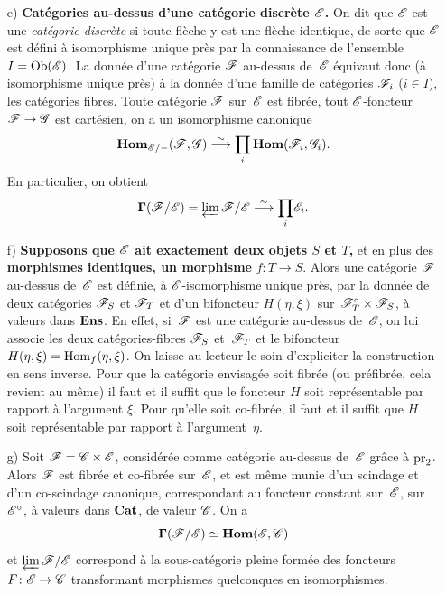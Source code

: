 \begin{enumerate}
Un cas int\'eressant est celui o\`u l'on a
$$
\cal{F}_b=\cal{F}_a^\circ,\quad G=F^\circ,\quad v=u^\circ.
$$
On appelle \emph{autodualité}
dans une cat\'egorie $\cal{C}$, la
donn\'ee d'un foncteur $D\colon \cal{C}\to\cal{C}^\circ$, et d'un
isomorphisme $u\colon DD^\circ\isomto\id_{\cal{C}}$, tels que $u$ et
l'isomorphisme $u^\circ\colon D^\circ D\isomto\id_{\cal{C}^\circ}$
fassent de~$(D,D^\circ)$ un couple de foncteurs adjoints,
(n\'ecessairement quasi-inverses l'un de l'autre). Cette condition
s'\'ecrit:
$$
D(u(x))=u(D(x))\qquad \text{pour tout $x\in\Ob(\cal{C})$.}
$$
\item[e)]
\textbf{Catégories au-dessus d'une catégorie
discrète $\cal{E}$.} On dit que $\cal{E}$ est une
\emph{catégorie discrète} si toute fl\`eche y est une
fl\`eche identique, de sorte que $\cal{E}$ est d\'efini \`a
isomorphisme unique pr\`es par la connaissance de l'ensemble
$I=\Ob(\cal{E})$. La donn\'ee d'une cat\'egorie $\cal{F}$
au-dessus de~$\cal{E}$ \'equivaut donc (\`a isomorphisme unique
pr\`es) \`a la donn\'ee d'une famille de cat\'egories
$\cal{F}_i$ ($i\in I$), les cat\'egories fibres. Toute cat\'egorie
$\cal{F}$ sur~$\cal{E}$ est fibr\'ee, tout $\cal{E}$-foncteur
$\cal{F}\to\cal{G}$ est cart\'esien, on a un isomorphisme canonique
$$ \SheafHom_{\cal{E}/-}(\cal{F},\cal{G}) \isomto
\underset{i}\prod\SheafHom(\cal{F}_i,\cal{G}_i).
$$
En particulier, on obtient
$$
\bf{\Gamma}(\cal{F}/\cal{E})=\varprojLim\cal{F}/\cal{E}\isomto\underset{i}\prod \cal{E}_i.
$$
\item[f)] \textbf{Supposons que $\cal{E}$ ait exactement deux objets
$S$ et $T$,} et en plus des \textbf{morphismes identiques, un
morphisme }$f\colon T\to S$. Alors une cat\'egorie $\cal{F}$
au-dessus de~$\cal{E}$ est d\'efinie, \`a $\cal{E}$-isomorphisme
unique pr\`es, par la donn\'ee de deux cat\'egories $\cal{F}_S$
et $\cal{F}_T$ et d'un bifoncteur $H(\eta,\xi)$ sur~$\cal{F}_T^\circ\times\cal{F}_S$, \`a valeurs dans $\mathbf{Ens}$. En effet,
si~$\cal{F}$ est une cat\'egorie au-dessus de~$\cal{E}$, on lui
associe les deux cat\'egories-fibres $\cal{F}_S$ et~$\cal{F}_T$ et
le bifoncteur $H(\eta,\xi)=\operatorname{Hom}_f(\eta,\xi)$. On laisse au lecteur le
soin d'expliciter la construction en sens inverse. Pour que la
cat\'egorie envisag\'ee soit fibr\'ee (ou pr\'efibr\'ee,
cela revient au m\^eme) il faut et il suffit que le foncteur $H$ soit
repr\'esentable par rapport \`a l'argument $\xi$. Pour qu'elle
soit co-fibr\'ee, il faut et il suffit que $H$ soit
repr\'esentable par rapport \`a l'argument~$\eta$.
\item[g)] Soit $\cal{F}=\cal{C}\times\cal{E}$, consid\'er\'ee
comme cat\'egorie au-dessus de~$\cal{E}$ gr\^ace \`a
$\mathrm{pr}_2$. Alors $\cal{F}$ est fibr\'ee et co-fibr\'ee sur~$\cal{E}$,
et est m\^eme munie d'un scindage et d'un co-scindage canonique,
correspondant au foncteur constant sur~$\cal{E}$, \resp sur~$\cal{E}^\circ$, \`a valeurs dans $\mathbf{Cat}$, de valeur $\cal{C}$. On a
$$
\bf{\Gamma}(\cal{F}/\cal{E})\simeq\SheafHom(\cal{E},\cal{C})
$$
et
$\varprojLim\cal{F}/\cal{E}$ correspond \`a la
sous-cat\'egorie pleine form\'ee des foncteurs
$F\colon\cal{E\to\cal{C}}$ transformant morphismes quelconques en
isomorphismes.
\end{enumerate}

